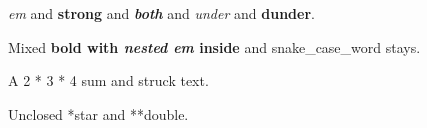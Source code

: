 \emph{em} and \textbf{strong} and \textbf{\emph{both}} and \emph{under} and \textbf{dunder}.

Mixed \textbf{bold with \emph{nested em} inside} and snake\_case\_word stays.

A 2 * 3 * 4 sum and struck text.

Unclosed *star and **double.

